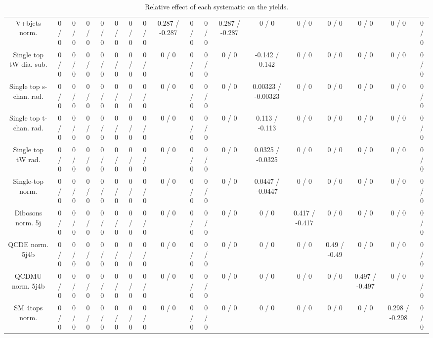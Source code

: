 \documentclass[10pt]{article}
\begin{document}
\begin{table}[htbp]
\begin{center}
\begin{tabular}{|c|c|c|c|c|c|c|c|c|c|c|c|c|c|c|c|c|c|}
  V+bjets norm. & 0 / 0 & 0 / 0 & 0 / 0 & 0 / 0 & 0 / 0 & 0 / 0 & 0 / 0 & 0.287 / -0.287 & 0 / 0 & 0 / 0 & 0.287 / -0.287 & 0 / 0 & 0 / 0 & 0 / 0 & 0 / 0 & 0 / 0 & 0 / 0 \\ 
  Single top tW dia. sub. & 0 / 0 & 0 / 0 & 0 / 0 & 0 / 0 & 0 / 0 & 0 / 0 & 0 / 0 & 0 / 0 & 0 / 0 & 0 / 0 & 0 / 0 & -0.142 / 0.142 & 0 / 0 & 0 / 0 & 0 / 0 & 0 / 0 & 0 / 0 \\ 
  Single top s-chan. rad. & 0 / 0 & 0 / 0 & 0 / 0 & 0 / 0 & 0 / 0 & 0 / 0 & 0 / 0 & 0 / 0 & 0 / 0 & 0 / 0 & 0 / 0 & 0.00323 / -0.00323 & 0 / 0 & 0 / 0 & 0 / 0 & 0 / 0 & 0 / 0 \\ 
  Single top t-chan. rad. & 0 / 0 & 0 / 0 & 0 / 0 & 0 / 0 & 0 / 0 & 0 / 0 & 0 / 0 & 0 / 0 & 0 / 0 & 0 / 0 & 0 / 0 & 0.113 / -0.113 & 0 / 0 & 0 / 0 & 0 / 0 & 0 / 0 & 0 / 0 \\ 
  Single top tW rad. & 0 / 0 & 0 / 0 & 0 / 0 & 0 / 0 & 0 / 0 & 0 / 0 & 0 / 0 & 0 / 0 & 0 / 0 & 0 / 0 & 0 / 0 & 0.0325 / -0.0325 & 0 / 0 & 0 / 0 & 0 / 0 & 0 / 0 & 0 / 0 \\ 
  Single-top norm. & 0 / 0 & 0 / 0 & 0 / 0 & 0 / 0 & 0 / 0 & 0 / 0 & 0 / 0 & 0 / 0 & 0 / 0 & 0 / 0 & 0 / 0 & 0.0447 / -0.0447 & 0 / 0 & 0 / 0 & 0 / 0 & 0 / 0 & 0 / 0 \\ 
  Dibosons norm. 5j & 0 / 0 & 0 / 0 & 0 / 0 & 0 / 0 & 0 / 0 & 0 / 0 & 0 / 0 & 0 / 0 & 0 / 0 & 0 / 0 & 0 / 0 & 0 / 0 & 0.417 / -0.417 & 0 / 0 & 0 / 0 & 0 / 0 & 0 / 0 \\ 
  QCDE norm. 5j4b & 0 / 0 & 0 / 0 & 0 / 0 & 0 / 0 & 0 / 0 & 0 / 0 & 0 / 0 & 0 / 0 & 0 / 0 & 0 / 0 & 0 / 0 & 0 / 0 & 0 / 0 & 0.49 / -0.49 & 0 / 0 & 0 / 0 & 0 / 0 \\ 
  QCDMU norm. 5j4b & 0 / 0 & 0 / 0 & 0 / 0 & 0 / 0 & 0 / 0 & 0 / 0 & 0 / 0 & 0 / 0 & 0 / 0 & 0 / 0 & 0 / 0 & 0 / 0 & 0 / 0 & 0 / 0 & 0.497 / -0.497 & 0 / 0 & 0 / 0 \\ 
  SM 4tops norm. & 0 / 0 & 0 / 0 & 0 / 0 & 0 / 0 & 0 / 0 & 0 / 0 & 0 / 0 & 0 / 0 & 0 / 0 & 0 / 0 & 0 / 0 & 0 / 0 & 0 / 0 & 0 / 0 & 0 / 0 & 0.298 / -0.298 & 0 / 0 \\ 
\hline 
\end{tabular} 
\caption{Relative effect of each systematic on the yields.} 
\end{center} 
\end{table} 
\end{document}
